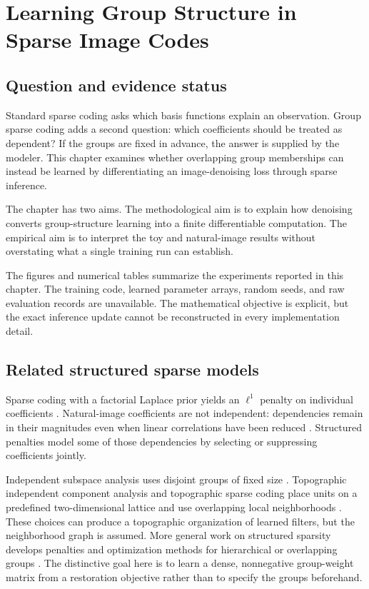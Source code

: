 \chapter{Learning Group Structure in Sparse Image Codes}
\label{chap:group-sparse}

\section{Question and evidence status}
\label{sec:group-question}

Standard sparse coding asks which basis functions explain an observation. Group sparse coding adds a second question: which coefficients should be treated as dependent? If the groups are fixed in advance, the answer is supplied by the modeler. This chapter examines whether overlapping group memberships can instead be learned by differentiating an image-denoising loss through sparse inference.

The chapter has two aims. The methodological aim is to explain how denoising converts group-structure learning into a finite differentiable computation. The empirical aim is to interpret the toy and natural-image results without overstating what a single training run can establish.

\begin{evidencenote}
The figures and numerical tables summarize the experiments reported in this chapter. The training code, learned parameter arrays, random seeds, and raw evaluation records are unavailable. The mathematical objective is explicit, but the exact inference update cannot be reconstructed in every implementation detail.
\end{evidencenote}

\section{Related structured sparse models}
\label{sec:group-related}

Sparse coding with a factorial Laplace prior yields an $\ell^1$ penalty on individual coefficients \citep{ob97}. Natural-image coefficients are not independent: dependencies remain in their magnitudes even when linear correlations have been reduced \citep{zc99,se01,ky09}. Structured penalties model some of those dependencies by selecting or suppressing coefficients jointly.

Independent subspace analysis uses disjoint groups of fixed size \citep{ha00}. Topographic independent component analysis and topographic sparse coding place units on a predefined two-dimensional lattice and use overlapping local neighborhoods \citep{ha01ica,ha01sc}. These choices can produce a topographic organization of learned filters, but the neighborhood graph is assumed. More general work on structured sparsity develops penalties and optimization methods for hierarchical or overlapping groups \citep{jenatton11,mairal11}. The distinctive goal here is to learn a dense, nonnegative group-weight matrix from a restoration objective rather than to specify the groups beforehand.

